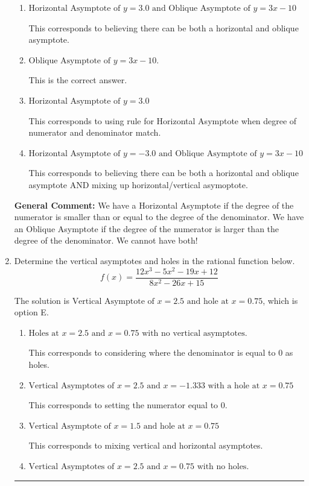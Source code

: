 \documentclass{extbook}[14pt]
\newcommand{\litem}[1]{\item #1

\rule{\textwidth}{0.4pt}}
\begin{document}
\begin{enumerate}
{\begin{enumerate}[label=\Alph*.]
This corresponds to considering where the denominator is equal to 0 as horizontal asymptote.
\item \( \text{Horizontal Asymptote of } y = 3.0 \text{ and Oblique Asymptote of } y = 3x -10 \)

This corresponds to believing there can be both a horizontal and oblique asymptote.
\item \( \text{Oblique Asymptote of } y = 3x -10. \)

This is the correct answer.
\item \( \text{Horizontal Asymptote of } y = 3.0  \)

This corresponds to using rule for Horizontal Asymptote when degree of numerator and denominator match.
\item \( \text{Horizontal Asymptote of } y = -3.0 \text{ and Oblique Asymptote of } y = 3x -10 \)

This corresponds to believing there can be both a horizontal and oblique asymptote AND mixing up horizontal/vertical asymoptote.
\end{enumerate}

\textbf{General Comment:} We have a Horizontal Asymptote if the degree of the numerator is smaller than or equal to the degree of the denominator. We have an Oblique Asymptote if the degree of the numerator is larger than the degree of the denominator. We cannot have both!
}
\litem{
Determine the vertical asymptotes and holes in the rational function below.
\[ f(x) = \frac{12x^{3} -5 x^{2} -19 x + 12}{8x^{2} -26 x + 15} \]

The solution is \( \text{Vertical Asymptote of } x = 2.5 \text{ and hole at } x = 0.75 \), which is option E.\begin{enumerate}[label=\Alph*.]
\item \( \text{Holes at } x = 2.5 \text{ and } x = 0.75 \text{ with no vertical asymptotes.} \)

This corresponds to considering where the denominator is equal to 0 as holes.
\item \( \text{Vertical Asymptotes of } x = 2.5 \text{ and } x = -1.333 \text{ with a hole at } x = 0.75 \)

This corresponds to setting the numerator equal to 0.
\item \( \text{Vertical Asymptote of } x = 1.5 \text{ and hole at } x = 0.75 \)

This corresponds to mixing vertical and horizontal asymptotes.
\item \( \text{Vertical Asymptotes of } x = 2.5 \text{ and } x = 0.75 \text{ with no holes.} \)


\end{enumerate}}
\end{enumerate}
\end{document}
